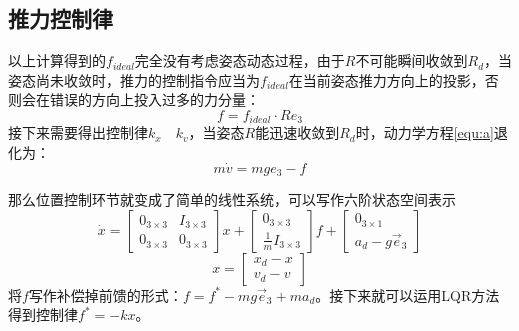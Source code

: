       \subsection{推力控制律}
      以上计算得到的$f_{ideal}$完全没有考虑姿态动态过程，由于$R$不可能瞬间收敛到$R_d$，当姿态尚未收敛时，推力的控制指令应当为$f_{ideal}$在当前姿态推力方向上的投影，否则会在错误的方向上投入过多的力分量：
      $$f=f_{ideal}\cdot R e_3$$
      接下来需要得出控制律$k_x \quad k_v$，当姿态$R$能迅速收敛到$R_d$时，动力学方程\ref{equ:a}退化为：
      $$m \dot v=mge_3-f$$

      那么位置控制环节就变成了简单的线性系统，可以写作六阶状态空间表示
      $$\dot x=\begin{bmatrix}
        0_{3\times 3} & I_{3\times 3} \\
        0_{3\times 3} & 0_{3\times 3}
    \end{bmatrix} x+\begin{bmatrix}
        0_{3\times 3} \\ \frac{1}{m} I_{3\times 3}
    \end{bmatrix} f +\begin{bmatrix}
        0_{3 \times 1} \\ a_d-g \vec e_3 
    \end{bmatrix}$$
    $$x=\begin{bmatrix}
        x_d -x \\ v_d -v
    \end{bmatrix}$$
      将$f$写作补偿掉前馈的形式：$f=f^*-mg \vec e_3 +m a_d$。接下来就可以运用LQR方法得到控制律$f^*=-kx$。
